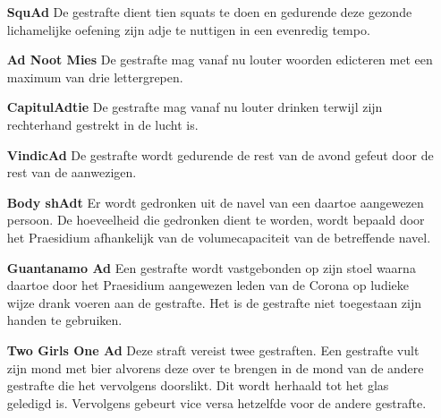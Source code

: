\begin{itemize}
    \item[\textbf{SquAd}] De gestrafte dient tien squats te doen en gedurende deze gezonde lichamelijke oefening zijn adje te nuttigen in een evenredig tempo. 
    
    \item[\textbf{Ad Noot Mies}] De gestrafte mag vanaf nu louter woorden edicteren met een maximum van drie lettergrepen.
    
    \item[\textbf{CapitulAdtie}] De gestrafte mag vanaf nu louter drinken terwijl zijn rechterhand gestrekt in de lucht is.
    
    \item[\textbf{VindicAd}] De gestrafte wordt gedurende de rest van de avond gefeut door de rest van de aanwezigen.
    
    \item[\textbf{Body shAdt}] Er wordt gedronken uit de navel van een daartoe aangewezen persoon. De hoeveelheid die gedronken dient te worden, wordt bepaald door het Praesidium afhankelijk van de volumecapaciteit van de betreffende navel. 

    \item[\textbf{Guantanamo Ad}] Een gestrafte wordt vastgebonden op zijn stoel waarna daartoe door het Praesidium aangewezen leden van de Corona op ludieke wijze drank voeren aan de gestrafte. Het is de gestrafte niet toegestaan zijn handen te gebruiken.

    \item[\textbf{Two Girls One Ad}] Deze straft vereist twee gestraften. Een gestrafte vult zijn mond met bier alvorens deze over te brengen in de mond van de andere gestrafte die het vervolgens doorslikt. Dit wordt herhaald tot het glas geledigd is. Vervolgens gebeurt vice versa hetzelfde voor de andere gestrafte. 

\end{itemize}
